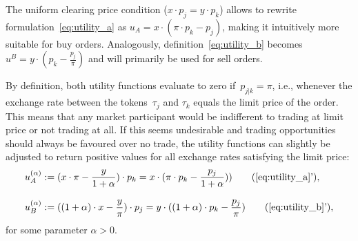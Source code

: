 \documentclass[11pt,parskip=full]{scrartcl}%
\newcommand*{\ie}{i.e., }
\begin{document}
The uniform clearing price condition ($x \cdot p_j = y \cdot p_k$) allows to rewrite formulation~\eqref{eq:utility_a} as $u_A = x \cdot (\pi \cdot p_k - p_j)$, making it intuitively more suitable for buy orders.
Analogously, definition~\eqref{eq:utility_b} becomes $u^B = y \cdot (p_k - \frac{p_j}{\pi})$ and will primarily be used for sell orders.

By definition, both utility functions evaluate to zero if~$p_{j|k} = \pi$, \ie whenever the exchange rate between the tokens~$\tau_j$ and $\tau_k$ equals the limit price of the order.
This means that any market participant would be indifferent to trading at limit price or not trading at all.
If this seems undesirable and trading opportunities should always be favoured over no trade, the utility functions can slightly be adjusted to return positive values for all exchange rates satisfying the limit price:
\begin{subequations}
\begin{align}
  u_A^{(\alpha)} &:= (x \cdot \pi - \frac{y}{1+\alpha}) \cdot p_k
  = x \cdot (\pi \cdot p_k - \frac{p_j}{1+\alpha}))
  \tag{\ref{eq:utility_a}'}\label{eq:utility_a_adjusted},\\[3mm]
  u_B^{(\alpha)} &:= ((1+\alpha) \cdot x - \frac{y}{\pi}) \cdot p_j
  = y \cdot ((1+\alpha) \cdot p_k - \frac{p_j}{\pi})
  \tag{\ref{eq:utility_b}'}\label{eq:utility_b_adjusted},
\end{align}
\label{eq:utility_adjusted}
\end{subequations}
for some parameter $\alpha > 0$.


\begin{comment}
\paragraph{Properties}

Here is a list of research questions that we would like to answer.

\begin{itemize}
  \item In an optimal solution, is it guaranteed that orders can always be fully executed if their
  limit prices are strictly higher (buy order) or lower (sell order) than the exchange rate between
  the respective token pair?
  If true, we would only need to resort to partially executing orders if the execution price is
  equal to the limit price.
  \item What is the impact of optimizing the trading volume vs. the traders' welfare?
\end{itemize}
\end{comment}
\end{document}
